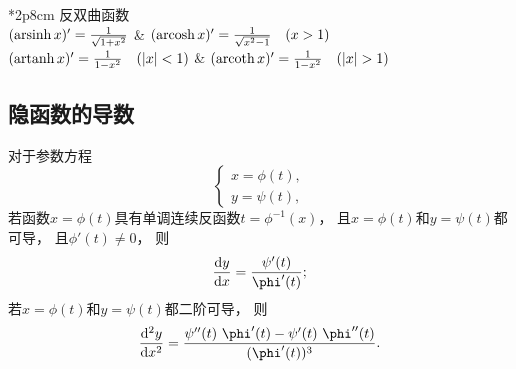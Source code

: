 \begin{table}[ht]
	\centering
	\begin{tblr}{*2{p{8cm}}}
		反双曲函数 \\ \hline
		\((\operatorname{arsinh} x)' = \frac1{\sqrt{1 + x^2}}\)
		& \((\operatorname{arcosh} x)' = \frac1{\sqrt{x^2 - 1}} \quad (x > 1)\) \\
		\((\operatorname{artanh} x)' = \frac1{1 - x^2} \quad(\abs{x}<1)\)
		& \((\operatorname{arcoth} x)' = \frac1{1-x^2} \quad(\abs{x}>1)\) \\
	\end{tblr}
\end{table}

\clearpage
\subsection*{隐函数的导数}
对于参数方程\[
	\left\{ \begin{array}{l}
		x = \phi(t), \\
		y = \psi(t),
	\end{array} \right.
\]
若函数\(x = \phi(t)\)具有单调连续反函数\(t=\phi^{-1}(x)\)，
且\(x = \phi(t)\)和\(y = \psi(t)\)都可导，
且\(\phi'(t) \neq 0\)，
则\[
	\dv{y}{x}
	= \frac{\psi'(t)}{\phi'(t)};
\]
若\(x = \phi(t)\)和\(y = \psi(t)\)都二阶可导，
则\[
	\dv[2]{y}{x}
	= \frac{\psi''(t)~\phi'(t) - \psi'(t)~\phi''(t)}{(\phi'(t))^3}.
\]
